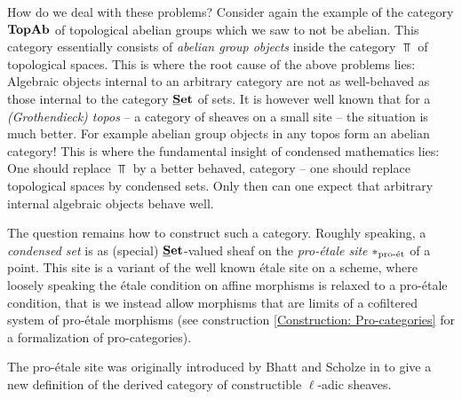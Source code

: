 How do we deal with these problems? Consider again the example of the category $\TopAb$ of topological abelian groups which we saw to not be abelian. This category essentially consists of \emph{abelian group objects} inside the category $\Top$ of topological spaces. This is where the root cause of the above problems lies: Algebraic objects internal to an arbitrary category are not as well-behaved as those internal to the category $\Set$ of sets. It is however well known that for a \emph{(Grothendieck) topos} -- a category of sheaves on a small site -- the situation is much better. For example abelian group objects in any topos form an abelian category! This is where the fundamental insight of condensed mathematics lies: One should replace $\Top$ by a better behaved,  category -- one should replace topological spaces by condensed sets. Only then can one expect that arbitrary internal algebraic objects behave well.

The question remains how to construct such a category. Roughly speaking, a \emph{condensed set} is as (special) $\Set$-valued sheaf on the \emph{pro-étale site} $\proetalesite{\ast}$ of a point. This site is a variant of the well known étale site on a scheme, where loosely speaking the étale condition on affine morphisms is relaxed to a pro-étale condition, that is we instead allow morphisms that are limits of a cofiltered system of pro-étale morphisms (see construction \ref{Construction: Pro-categories} for a formalization of pro-categories).

The pro-étale site was originally introduced by Bhatt and Scholze in \cite{bhatt2014proetaletopologyschemes} to give a new definition of the derived category of constructible $\ell$-adic sheaves.

